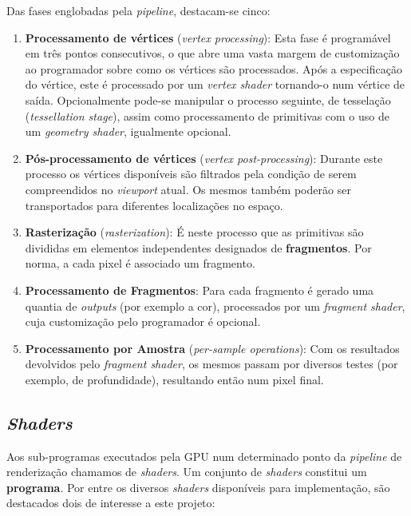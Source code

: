 Das fases englobadas pela \textit{pipeline}, destacam-se cinco:

\begin{enumerate}
    \item \textbf{Processamento de vértices} (\textit{vertex processing}):
    Esta fase é programável em três pontos consecutivos, o que abre uma vasta margem de customização ao programador sobre como os vértices são processados.
    Após a especificação do vértice, este é processado por um \textit{vertex shader} tornando-o num vértice de saída. Opcionalmente pode-se manipular o processo seguinte, de tesselação (\textit{tessellation stage}), assim como processamento de primitivas com o uso de um \textit{geometry shader}, igualmente opcional.
    
    \item \textbf{Pós-processamento de vértices} (\textit{vertex post-processing}):
    Durante este processo os vértices disponíveis são filtrados pela condição de serem compreendidos no \textit{viewport} atual. Os mesmos também poderão ser transportados para diferentes localizações no espaço.
    
    \item \textbf{Rasterização} (\textit{rasterization}):
    É neste processo que as primitivas são divididas em elementos independentes designados de \textbf{fragmentos}. Por norma, a cada pixel é associado um fragmento.
    
    \item \textbf{Processamento de Fragmentos}:
    Para cada fragmento é gerado uma quantia de \textit{outputs} (por exemplo a cor), processados por um \textit{fragment shader}, cuja customização pelo programador é opcional.
    
    \item \textbf{Processamento por Amostra} (\textit{per-sample operations}): Com os resultados devolvidos pelo \textit{fragment shader}, os mesmos passam por diversos testes (por exemplo, de profundidade), resultando então num pixel final.
\end{enumerate}


\subsection{\textit{Shaders}}
\label{ssec::arte:opengl:shaders}

Aos sub-programas executados pela \ac{GPU} num determinado ponto da \textit{pipeline} de renderização chamamos de \textit{shaders}. Um conjunto de \textit{shaders} constitui um \textbf{programa}. Por entre os diversos \textit{shaders} disponíveis para implementação, são destacados dois de interesse a este projeto:

